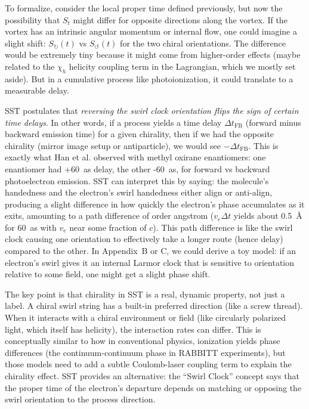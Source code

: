 \documentclass[10pt,reprint,aps,onecolumn,nofootinbib]{revtex4-2}
\begin{document}
To formalize, consider the local proper time defined previously, but now the possibility that $S_t$ might differ for opposite directions along the vortex. If the vortex has an intrinsic angular momentum or internal flow, one could imagine a slight shift: $S_{\circlearrowright}(t)$ vs $S_{\circlearrowleft}(t)$ for the two chiral orientations. The difference would be extremely tiny because it might come from higher-order effects (maybe related to the $\chi_h$ helicity coupling term in the Lagrangian, which we mostly set aside). But in a cumulative process like photoionization, it could translate to a measurable delay.


SST postulates that \emph{reversing the swirl clock orientation flips the sign of certain time delays}. In other words, if a process yields a time delay $\Delta t_{\text{FB}}$ (forward minus backward emission time) for a given chirality, then if we had the opposite chirality (mirror image setup or antiparticle), we would see $-\Delta t_{\text{FB}}$. This is exactly what Han et al. observed with methyl oxirane enantiomers: one enantiomer had +60~as delay, the other -60~as, for forward vs backward photoelectron emission. SST can interpret this by saying: the molecule’s handedness and the electron’s swirl handedness either align or anti-align, producing a slight difference in how quickly the electron’s phase accumulates as it exits, amounting to a path difference of order angstrom ($v_e \Delta t$ yields about 0.5~Å for 60~as with $v_e$ near some fraction of $c$). This path difference is like the swirl clock causing one orientation to effectively take a longer route (hence delay) compared to the other. In Appendix~B or C, we could derive a toy model: if an electron’s swirl gives it an internal Larmor clock that is sensitive to orientation relative to some field, one might get a slight phase shift.


The key point is that chirality in SST is a real, dynamic property, not just a label. A chiral swirl string has a built-in preferred direction (like a screw thread). When it interacts with a chiral environment or field (like circularly polarized light, which itself has helicity), the interaction rates can differ. This is conceptually similar to how in conventional physics, ionization yields phase differences (the continuum-continuum phase in RABBITT experiments), but those models need to add a subtle Coulomb-laser coupling term to explain the chirality effect. SST provides an alternative: the “Swirl Clock” concept says that the proper time of the electron’s departure depends on matching or opposing the swirl orientation to the process direction.
\end{document}
